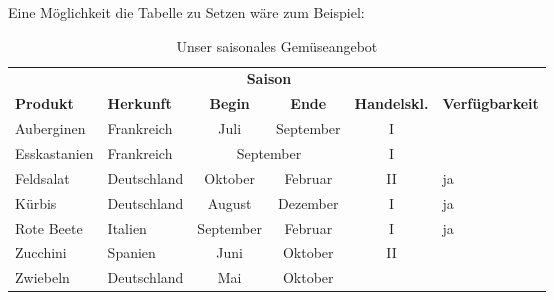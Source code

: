 \documentclass{scrartcl}
\begin{document}
\newpage 
\newsavebox{\SolutionCodeA}
\begin{lrbox}{\SolutionCodeA}
\begin{minipage}{\textwidth}
Eine Möglichkeit die Tabelle zu Setzen wäre zum Beispiel:

\begin{LTXexample}[pos=b]
\begin{table}
	\centering
	\begin{tabular}{llcccl}
		\toprule
		&& \multicolumn{2}{c}{\textbf{Saison}} \\
		\cmidrule{3-4}
		\textbf{Produkt} & \textbf{Herkunft} & \textbf{Begin} & \textbf{Ende} & \textbf{Handelskl.} & \textbf{Verfügbarkeit}\\
		\midrule
		Auberginen & Frankreich & Juli & September & I &  \\
		Esskastanien & Frankreich & \multicolumn{2}{c}{September} & I &  \\
		Feldsalat & Deutschland & Oktober & Februar & II & ja \\
		Kürbis & Deutschland & August & Dezember & I & ja\\
		Rote Beete & Italien & September & Februar & I  & ja\\
		Zucchini & Spanien & Juni & Oktober & II &  \\
		Zwiebeln & Deutschland & Mai & Oktober &  & \\
		\bottomrule
	\end{tabular}
	\caption{Unser saisonales Gemüseangebot}
\end{table}
\end{LTXexample}
\end{minipage}
\end{lrbox}

\begin{solution}
\noindent\usebox\SolutionCodeA
\end{solution}

\newpage 
\end{document}
